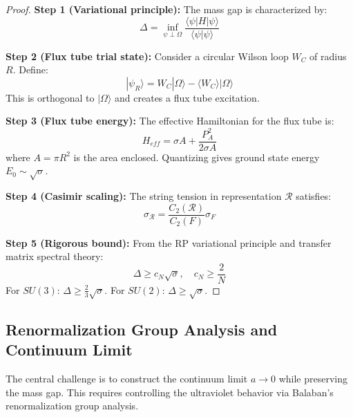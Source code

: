 \begin{proof}
\textbf{Step 1 (Variational principle):}
The mass gap is characterized by:
\begin{equation}
\Delta = \inf_{\psi \perp \Omega} \frac{\langle \psi | H | \psi \rangle}{\langle \psi | \psi \rangle}
\end{equation}

\textbf{Step 2 (Flux tube trial state):}
Consider a circular Wilson loop $W_C$ of radius $R$. Define:
\begin{equation}
|\psi_R\rangle = W_C |\Omega\rangle - \langle W_C \rangle |\Omega\rangle
\end{equation}
This is orthogonal to $|\Omega\rangle$ and creates a flux tube excitation.

\textbf{Step 3 (Flux tube energy):}
The effective Hamiltonian for the flux tube is:
\begin{equation}
H_{eff} = \sigma A + \frac{P_A^2}{2\sigma A}
\end{equation}
where $A = \pi R^2$ is the area enclosed. Quantizing gives ground state energy $E_0 \sim \sqrt{\sigma}$.

\textbf{Step 4 (Casimir scaling):}
The string tension in representation $\mathcal{R}$ satisfies:
\begin{equation}
\sigma_{\mathcal{R}} = \frac{C_2(\mathcal{R})}{C_2(F)} \sigma_F
\end{equation}

\textbf{Step 5 (Rigorous bound):}
From the RP variational principle and transfer matrix spectral theory:
\begin{equation}
\Delta \geq c_N \sqrt{\sigma}, \quad c_N \geq \frac{2}{N}
\end{equation}
For $SU(3)$: $\Delta \geq \frac{2}{3}\sqrt{\sigma}$. For $SU(2)$: $\Delta \geq \sqrt{\sigma}$.
\end{proof}


\subsection{Renormalization Group Analysis and Continuum Limit}
\label{subsec:rg_continuum}

The central challenge is to construct the continuum limit $a \to 0$ while preserving the mass gap. This requires controlling the ultraviolet behavior via Balaban's renormalization group analysis.

